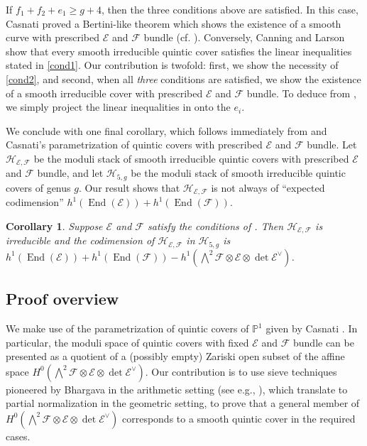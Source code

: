 \documentclass[11pt]{amsart}
\numberwithin{theorem}{section}
\numberwithin{equation}{section}
\newtheorem{coro}[theorem]{Corollary}
\theoremstyle{definition}\newtheorem{defn}[theorem]{Definition}
\theoremstyle{definition}\newtheorem{remark}[theorem]{Remark}
\theoremstyle{definition}\newtheorem{question}[theorem]{Question}
\theoremstyle{definition}\newtheorem{problem}[theorem]{Problem}
\newcommand{\PP}{\mathbb{P}}
\newcommand{\cE}{\mathcal{E}}
\newcommand{\cF}{\mathcal{F}}
\newcommand{\cH}{\mathcal{H}}
\DeclareMathOperator{\End}{End}
\begin{document}
If $f_1 + f_2 + e_1 \geq g+4$, then the three conditions above are satisfied. In this case, Casnati proved a Bertini-like theorem which shows the existence of a smooth curve with prescribed $\cE$ and $\cF$ bundle \cite[Theorem~1.2]{casnati} (cf. \cite{P}). Conversely, Canning and Larson \cite[Section~5]{CL} show that every smooth irreducible quintic cover satisfies the linear inequalities stated in \ref{cond1}. Our contribution is twofold: first, we show the necessity of \ref{cond2}, and second, when all \emph{ three} conditions are satisfied, we show the existence of a smooth irreducible cover with prescribed $\cE$ and $\cF$ bundle. To deduce  from , we simply project the linear inequalities in  onto the $e_i$. 

We conclude with one final corollary, which follows immediately from  and Casnati's parametrization of quintic covers with prescribed $\cE$ and $\cF$ bundle. Let $\cH_{\cE,\cF}$ be the moduli stack of smooth irreducible quintic covers with prescribed $\cE$ and $\cF$ bundle, and let $\cH_{5,g}$ be the moduli stack of smooth irreducible quintic covers of genus $g$. Our result shows that $\cH_{\cE,\cF}$ is not always of ``expected codimension'' $h^1(\End(\cE)) + h^1(\End(\cF))$.

\begin{coro}
\label{coro:dim}
Suppose $\cE$ and $\cF$ satisfy the conditions of . Then $\cH_{\cE,\cF}$ is irreducible and the codimension of $\cH_{\cE,\cF}$ in $\cH_{5,g}$ is $h^1(\End(\cE)) + h^1(\End(\cF)) - h^1(\bigwedge^2 \cF \otimes \cE \otimes \det \cE^{\vee})$.
\end{coro}

\subsection{Proof overview}
We make use of the parametrization of quintic covers of $\PP^1$ given by Casnati \cite[Theorem~1.1]{casnati}. In particular, the moduli space of quintic covers with fixed $\cE$ and $\cF$ bundle can be presented as a quotient of a (possibly empty) Zariski open subset of the affine space $H^0( \bigwedge^2 \cF \otimes \cE \otimes \det \cE^{\vee})$. Our contribution is to use sieve techniques pioneered by Bhargava in the arithmetic setting (see e.g., \cite{B-quinticdiscs}), which translate to partial normalization in the geometric setting, to prove that a general member of $H^0(\bigwedge^2 \cF \otimes \cE \otimes \det \cE^{\vee})$ corresponds to a smooth quintic cover in the required cases.
\end{document}
